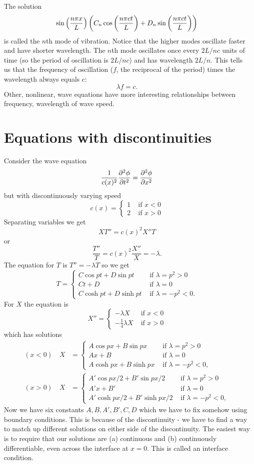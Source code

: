 \begin{rmk}
The solution
\[\sin\left(\frac{n \pi x}{L}\right)\left(C_n\cos\left(\frac{n\pi ct}{L}\right)+D_n\sin\left(\frac{n\pi ct}{L}\right)\right)\]
is called the $n$th mode of vibration. Notice that the higher modes oscillate faster and have shorter wavelength. The $n$th mode oscillates once every $2L/nc$ units of time (so the period of oscillation is $2L/nc$) and has wavelength $2L/n$. This tells us that the frequency of oscillation ($f$, the reciprocal of the period) times the wavelength always equals $c$:
\[\lambda f=c.\]
Other, nonlinear, wave equations have more interesting relationships between frequency, wavelength of wave speed.
\end{rmk}

\section{Equations with discontinuities}

Consider the wave equation
\[\frac{1}{c(x)^2}\frac{\partial^2 \phi}{\partial t ^2}=\frac{\partial^2 \phi}{\partial x ^2}\]
but with discontinuously varying speed
\[c(x)=\begin{cases}
1&\mbox{ if }x<0\\
2&\mbox{ if }x>0
\end{cases}\]
Separating variables we get
\[XT''=c(x)^2X''T\]
or
\[\frac{T''}{T}=c(x)^2\frac{X''}{X}=-\lambda.\]
The equation for $T$ is $T''=-\lambda T$ so we get
\[
T=\begin{cases}
  C\cos pt+D\sin pt&\mbox{ if }\lambda=p^2>0\\
  Ct+D&\mbox{ if }\lambda=0\\
  C\cosh pt+D\sinh pt&\mbox{ if }\lambda=-p^2<0.
\end{cases}
\]
For $X$ the equation is
\[
X''=\begin{cases}
-\lambda X&\mbox{ if }x<0\\
-\frac{1}{4}\lambda X&\mbox{ if }x>0
\end{cases}
\]
which has solutions
\begin{align*}
(x<0)\quad X&=\begin{cases}
  A\cos px+B\sin px&\mbox{ if }\lambda=p^2>0\\
  Ax+B&\mbox{ if }\lambda=0\\
  A\cosh px+B\sinh px&\mbox{ if }\lambda=-p^2<0,
\end{cases}\\
(x>0)\quad X&=\begin{cases}
  A'\cos px/2+B'\sin px/2&\mbox{ if }\lambda=p^2>0\\
  A'x+B'&\mbox{ if }\lambda=0\\
  A'\cosh px/2+B'\sinh px/2&\mbox{ if }\lambda=-p^2<0,
\end{cases}
\end{align*}
Now we have six constants $A,B,A',B',C,D$ which we have to fix somehow using boundary conditions. This is because of the discontinuity - we have to find a way to match up different solutions on either side of the discontinuity. The easiest way is to require that our solutions are (a) continuous and (b) continuously differentiable, even across the interface at $x=0$. This is called an interface condition.

